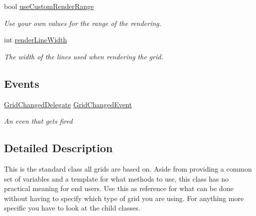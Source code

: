 \begin{DoxyCompactItemize}
bool \hyperlink{class_g_f_grid_acb950aa31097c85e153cd9a642900a31_acb950aa31097c85e153cd9a642900a31}{use\+Custom\+Render\+Range}
\begin{DoxyCompactList}\small\item\em Use your own values for the range of the rendering.\end{DoxyCompactList}\item 
int \hyperlink{class_g_f_grid_a6712a2e6fec379ea55a0a53ca5867216_a6712a2e6fec379ea55a0a53ca5867216}{render\+Line\+Width}
\begin{DoxyCompactList}\small\item\em The width of the lines used when rendering the grid.\end{DoxyCompactList}\end{DoxyCompactItemize}
\subsection*{Events}
\begin{DoxyCompactItemize}
\item 
\hyperlink{class_g_f_grid_a1b011f573c51561fbd9e411f821ba820_a1b011f573c51561fbd9e411f821ba820}{Grid\+Changed\+Delegate} \hyperlink{class_g_f_grid_af3bfbed41ba24f963e871921c663f1f8_af3bfbed41ba24f963e871921c663f1f8}{Grid\+Changed\+Event}
\begin{DoxyCompactList}\small\item\em An even that gets fired \end{DoxyCompactList}\end{DoxyCompactItemize}


\subsection{Detailed Description}
This is the standard class all grids are based on. Aside from providing a common set of variables and a template for what methods to use, this class has no practical meaning for end users. Use this as reference for what can be done without having to specify which type of grid you are using. For anything more specific you have to look at the child classes. 

